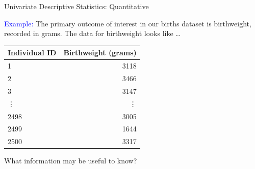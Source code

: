 \documentclass[10pt,t]{beamer}
\begin{document}
\begin{frame}{Univariate Descriptive Statistics: Quantitative}

\textcolor{blue}{Example:} The primary outcome of interest in our births dataset is birthweight, recorded in grams. The data for birthweight looks like \dots

\vspace{0.3cm}

\begin{table}
	\centering
	\begin{tabular}{l|r}
		\textbf{Individual ID} & \textbf{Birthweight (grams)} \\
		\hline
		1 & 3118\\
		\hline
		2 & 3466\\
		\hline
		3 & 3147 \\
		\hline 
		\vdots & \vdots \\
		\hline
		2498 & 3005 \\
		\hline 
		2499 & 1644 \\
		2500 & 3317
	\end{tabular}
\end{table}

\vspace{0.3cm}

What information may be useful to know?

\end{frame}
\end{document}
